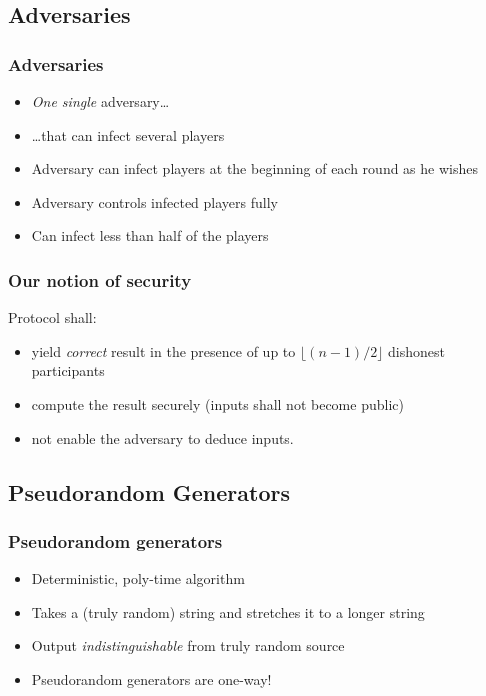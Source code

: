 \documentclass{beamer}
\begin{document}
\subsection{Adversaries}
\label{sec:adversaries}

\begin{frame}
  \frametitle{Adversaries}
  \begin{itemize}
  \item \emph{One single} adversary\dots
  \item \dots that can infect several players
  \item Adversary can infect players at the beginning of each round as he wishes
  \item Adversary controls infected players fully
  \item Can infect less than half of the players
  \end{itemize}
\end{frame}

\begin{frame}
  \frametitle{Our notion of security}
  Protocol shall:
  \begin{itemize}
  \item yield \emph{correct} result in the presence of up to $\lfloor (n-1)/2 \rfloor$ dishonest participants
  \item compute the result securely (inputs shall not become public)
  \item not enable the adversary to deduce inputs.
  \end{itemize}

\end{frame}

\subsection{Pseudorandom Generators}
\label{sec:pseudorandom-generators}

\begin{frame}
  \frametitle{Pseudorandom generators}
  \begin{itemize}
  \item Deterministic, poly-time algorithm
  \item Takes a (truly random) string and stretches it to a longer string
  \item Output \emph{indistinguishable} from truly random source
  \item Pseudorandom generators are one-way!
  \end{itemize}
\end{frame}
\end{document}
